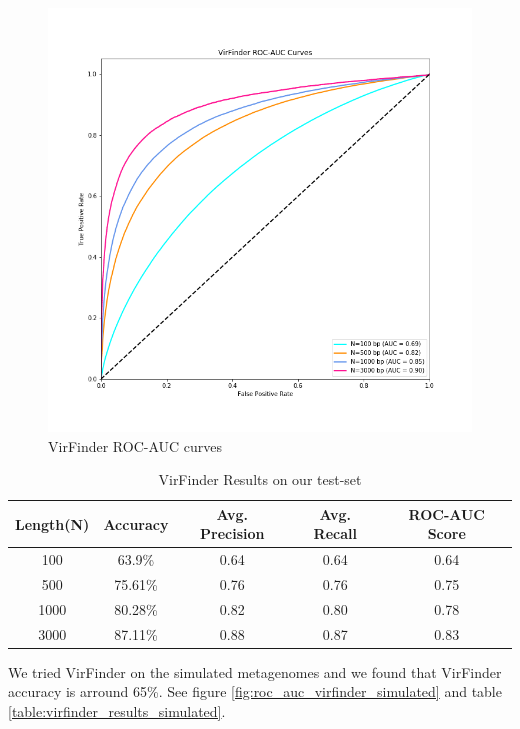 \documentclass[conference]{IEEEtran}
\begin{document}
\begin{figure}
	\centering
	\includegraphics[width=\columnwidth]{imgs/roc_auc.png}
	\caption{VirFinder ROC-AUC curves}
	\label{fig:roc_auc_virfinder}
\end{figure}


\begin{table}[h!]
	\centering
	\begin{tabular}{||c c c c c||} 
		Length(N) &	Accuracy & Avg. Precision & Avg. Recall &	ROC-AUC Score \\ [0.5ex] 
		\hline\hline
		100 &	63.9\%	& 0.64 & 0.64 & 0.64 \\
		500 &	75.61\% &	0.76 & 0.76 & 0.75 \\
		1000 &	80.28\% & 0.82 & 0.80 & 0.78 \\
		3000 &	87.11\% & 0.88 & 0.87 & 0.83\\[1ex]
	\end{tabular}
	\caption{VirFinder Results on our test-set}
	\label{table:virfinder_results}
\end{table}


We tried VirFinder on the simulated metagenomes and we found that VirFinder accuracy is arround 65\%. See figure \ref{fig:roc_auc_virfinder_simulated} and table \ref{table:virfinder_results_simulated}.
\end{document}

